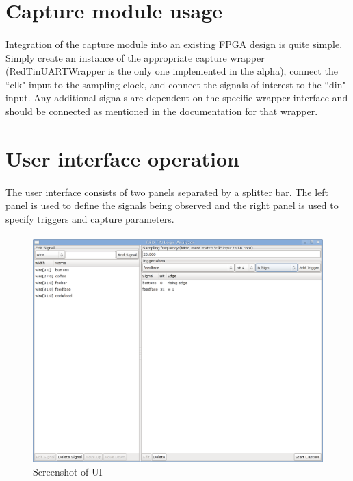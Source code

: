 \documentclass[pdftex]{article}
\begin{document}
\pagebreak
\section{Capture module usage}

\paragraph*{}
Integration of the capture module into an existing FPGA design is quite simple. Simply create an instance of the
appropriate capture wrapper (RedTinUARTWrapper is the only one implemented in the alpha), connect the ``clk" input
to the sampling clock, and connect the signals of interest to the ``din" input. Any additional signals are dependent on
the specific wrapper interface and should be connected as mentioned in the documentation for that wrapper.

\section{User interface operation}

\paragraph*{}
The user interface consists of two panels separated by a splitter bar. The left panel is used to define the signals
being observed and the right panel is used to specify triggers and capture parameters.

\paragraph*{}
\begin{figure}[h]
\includegraphics[scale=0.45]{gui-shot1.png}
\caption{Screenshot of UI}
\label{gui-overview}
\end{figure}
\end{document}
